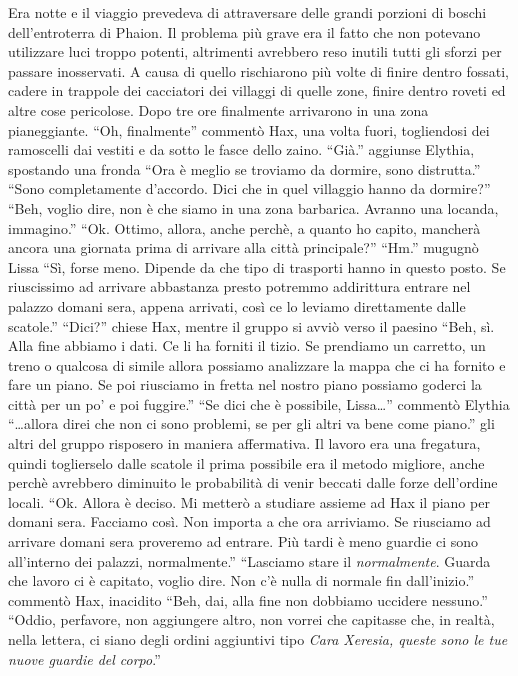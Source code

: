     Era notte e il viaggio prevedeva di attraversare delle grandi porzioni
    di boschi dell'entroterra di Phaion. Il problema più grave era il fatto
    che non potevano utilizzare luci troppo potenti, altrimenti avrebbero
    reso inutili tutti gli sforzi per passare inosservati. A causa di
    quello rischiarono più volte di finire dentro fossati, cadere in
    trappole dei cacciatori dei villaggi di quelle zone, finire dentro
    roveti ed altre cose pericolose. Dopo tre ore finalmente arrivarono in
    una zona pianeggiante. ``Oh, finalmente'' commentò Hax, una volta
    fuori, togliendosi dei ramoscelli dai vestiti e da sotto le fasce dello
    zaino. ``Già.'' aggiunse Elythia, spostando una fronda ``Ora è meglio
    se troviamo da dormire, sono distrutta.'' ``Sono completamente
    d'accordo. Dici che in quel villaggio hanno da dormire?'' ``Beh, voglio
    dire, non è che siamo in una zona barbarica. Avranno una locanda,
    immagino.'' ``Ok. Ottimo, allora, anche perchè, a quanto ho capito,
    mancherà ancora una giornata prima di arrivare alla città principale?''
    ``Hm.'' mugugnò Lissa ``Sì, forse meno. Dipende da che tipo di
    trasporti hanno in questo posto. Se riuscissimo ad arrivare abbastanza
    presto potremmo addirittura entrare nel palazzo domani sera, appena
    arrivati, così ce lo leviamo direttamente dalle scatole.'' ``Dici?''
    chiese Hax, mentre il gruppo si avviò verso il paesino ``Beh, sì. Alla
    fine abbiamo i dati. Ce li ha forniti il tizio. Se prendiamo un
    carretto, un treno o qualcosa di simile allora possiamo analizzare la
    mappa che ci ha fornito e fare un piano. Se poi riusciamo in fretta nel
    nostro piano possiamo goderci la città per un po' e poi fuggire.''
    ``Se dici che è possibile, Lissa\dots{}'' commentò Elythia
    ``\dots{}allora direi che non ci sono problemi, se per gli altri va
    bene come piano.'' gli altri del gruppo risposero in maniera
    affermativa. Il lavoro era una fregatura, quindi toglierselo dalle
    scatole il prima possibile era il metodo migliore, anche perchè
    avrebbero diminuito le probabilità di venir beccati dalle forze
    dell'ordine locali. ``Ok. Allora è deciso. Mi metterò a studiare
    assieme ad Hax il piano per domani sera. Facciamo così. Non importa a
    che ora arriviamo. Se riusciamo ad arrivare domani sera proveremo ad
    entrare. Più tardi è meno guardie ci sono all'interno dei palazzi,
    normalmente.'' ``Lasciamo stare il \emph{normalmente}. Guarda che
    lavoro ci è capitato, voglio dire. Non c'è nulla di normale fin
    dall'inizio.'' commentò Hax, inacidito ``Beh, dai, alla fine non
    dobbiamo uccidere nessuno.'' ``Oddio, perfavore, non aggiungere altro,
    non vorrei che capitasse che, in realtà, nella lettera, ci siano degli
    ordini aggiuntivi tipo \emph{Cara Xeresia, queste sono le tue nuove
    guardie del corpo}.''

